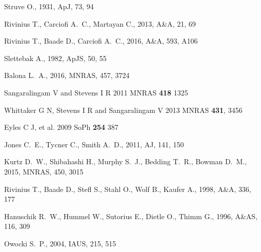\documentclass[]{article}
\begin{document}
\begin{thebibliography}{}

 Struve O., 1931, ApJ, 73, 94

 Rivinius T., Carciofi A.~C., Martayan C., 2013, A\&A, 21, 69 

 Rivinius T., Baade D., Carciofi A.~C., 2016, A\&A, 593, A106 

 Slettebak A., 1982, ApJS, 50, 55 

 Balona L.~A., 2016, MNRAS, 457, 3724 

 Sangaralingam V and Stevens I R 2011 MNRAS {\bf 418} 1325

 Whittaker G N, Stevens I R and Sangaralingam V 2013 MNRAS {\bf 431}, 3456 

 Eyles C J, et al. 2009 SoPh {\bf 254} 387

 Jones C.~E., Tycner C., Smith A.~D., 2011, AJ, 141, 150

 Kurtz D.~W., Shibahashi H., Murphy S.~J., Bedding T.~R., Bowman D.~M., 2015, MNRAS, 450, 3015

 Rivinius T., Baade D., Stefl S., Stahl O., Wolf B., Kaufer A., 1998, A\&A, 336, 177

 Hanuschik R.~W., Hummel W., Sutorius E., Dietle O., Thimm G., 1996, A\&AS, 116, 309 

 Owocki S.~P., 2004, IAUS, 215, 515 












\end{thebibliography}
\end{document}

